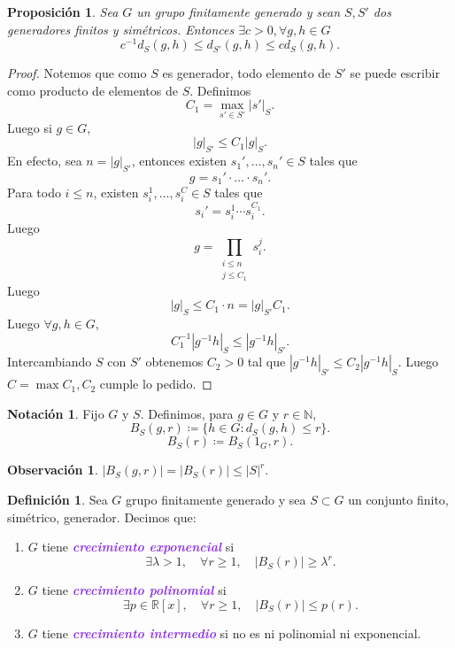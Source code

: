 \documentclass{article}
\newtheorem{proposition}[theorem]{Proposición}
\theoremstyle{definition}
\newtheorem{definition}[theorem]{Definición}
\newtheorem*{notation}{Notación}
\newtheorem*{obs}{Observación}
\theoremstyle{remark}
\numberwithin{equation}{section}
\newcommand{\N}{\mathbb{N}}
\newcommand{\R}{\mathbb{R}}
\newcommand{\lam}{\lambda}
\renewcommand{\c}{\cdot}
\newcommand{\abs}[1]{\left| #1 \right|}
\newcommand{\wea}[1]{\textcolor{BlueViolet}{\textbf{\emph{#1}}}}
\begin{document}
\begin{proposition}
  Sea $G$ un grupo finitamente generado y sean $S,S'$ dos generadores finitos y simétricos. Entonces $\exists c>0, \forall g,h \in G$
  \[c^{-1} d_S(g,h) \leq d_{S'}(g,h) \leq c d_S(g,h).\]
\end{proposition}
\begin{proof}
  Notemos que como $S$ es generador, todo elemento de $S'$ se puede escribir como producto de elementos de $S$. Definimos
  \[C_1 = \max_{s' \in S'} \abs{s'}_S.\]
  Luego si $g \in G$,
  \[\abs{g}_{S'} \leq C_1 \abs{g}_S.\]
  En efecto, sea $n = \abs{g}_{S'}$, entonces existen $s_1',\dots,s_n' \in S$ tales que
  \[g = s_1' \c \dots \c s_n'.\]
  Para todo $i \leq n$, existen $s_i^1, \dots, s_i^C \in S$ tales que
  \[s_i' = s_i^1 \cdots s_i^{C_1}.\]
  Luego
  \[g = \prod_{\substack{i \leq n \\ j \leq C_1}} s_i^j.\]
  Luego
  \[\abs{g}_S \leq C_1 \cdot n = \abs{g}_{S'} C_1.\]
  Luego $\forall g,h \in G$,
  \[C_1^{-1} \abs{g^{-1} h}_S \leq \abs{g^{-1} h}_{S'}.\]
  Intercambiando $S$ con $S'$ obtenemos $C_2 > 0$ tal que $\abs{g^{-1}h}_{S'} \leq C_2 \abs{g^{-1} h}_S.$
  Luego $C = \max{C_1,C_2}$ cumple lo pedido.
\end{proof}

\begin{notation}
  Fijo $G$ y $S$. Definimos, para $g \in G$ y $r \in \N$,
  \[B_S(g,r) \coloneqq \{h \in G : d_S(g,h) \leq r\}.\]
  \[B_S(r) \coloneqq B_S(1_G,r).\]
\end{notation}

\begin{obs}
  $\abs{B_S(g,r)} = \abs{B_S(r)} \leq \abs{S}^r$.
\end{obs}

\begin{definition}
  Sea $G$ grupo finitamente generado y sea $S \subset G$ un conjunto finito, simétrico, generador. Decimos que:
  \begin{enumerate}[(1)]
    \item $G$ tiene \wea{crecimiento exponencial} si $$\exists \lam>1, \quad \forall r \geq 1, \quad \abs{B_S(r)} \geq \lam^r.$$
    \item $G$ tiene \wea{crecimiento polinomial} si $$\exists p \in \R[x], \quad \forall r \geq 1, \quad \abs{B_S(r)} \leq p(r).$$
    \item $G$ tiene \wea{crecimiento intermedio} si no es ni polinomial ni exponencial.
  \end{enumerate}
\end{definition}
\end{document}
